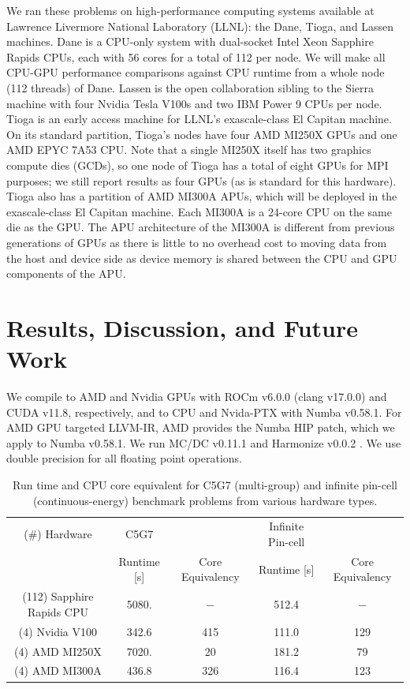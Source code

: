 We ran these problems on high-performance computing systems available at Lawrence Livermore National Laboratory (LLNL): the Dane, Tioga, and Lassen machines.
Dane is a CPU-only system with dual-socket Intel Xeon Sapphire Rapids CPUs, each with 56 cores for a total of 112 per node. 
We will make all CPU-GPU performance comparisons against CPU runtime from a whole node (112 threads) of Dane.
Lassen is the open collaboration sibling to the Sierra machine with four Nvidia Tesla V100s and two IBM Power 9 CPUs per node.
Tioga is an early access machine for LLNL's exascale-class El Capitan machine.
On its standard partition, Tioga's nodes have four AMD MI250X GPUs and one AMD EPYC 7A53 CPU.
Note that a single MI250X itself has two graphics compute dies (GCDs), so one node of Tioga has a total of eight GPUs for MPI purposes; we still report results as four GPUs (as is standard for this hardware).
Tioga also has a partition of AMD MI300A APUs, which will be deployed in the exascale-class El Capitan machine.
Each MI300A is a 24-core CPU on the same die as the GPU.
The APU architecture of the MI300A is different from previous generations of GPUs as there is little to no overhead cost to moving data from the host and device side as device memory is shared between the CPU and GPU components of the APU.

\section{Results, Discussion, and Future Work}
\label{sec:mcdc_prof:results}

We compile to AMD and Nvidia GPUs with ROCm v6.0.0 (clang v17.0.0) and CUDA v11.8, respectively, 
and to CPU and Nvida-PTX with Numba v0.58.1.
For AMD GPU targeted LLVM-IR, AMD provides the Numba HIP patch, which we apply to Numba v0.58.1. %
We run MC/DC v0.11.1 \cite{transport_cement_mcdc_2024} and Harmonize v0.0.2 \cite{harmonize}.
We use double precision for all floating point operations.

\begin{table}[ht]
    \centering
    \caption{Run time and CPU core equivalent for C5G7 (multi-group) and infinite pin-cell (continuous-energy) benchmark problems from various hardware types.}
    \begin{tabular}{@{}c c c c c@{}}
        \hline
        (\#) Hardware & C5G7 & & Infinite Pin-cell & \\
        & Runtime [s] & Core Equivalency & Runtime [s] & Core Equivalency \\
        \hline
        (112) Sapphire Rapids CPU & 5080. & $-$ & 512.4 & $-$ \\
        (4) Nvidia V100 & 342.6 & 415 & 111.0 & 129 \\
        (4) AMD MI250X & 7020. & 20 & 181.2 & 79 \\
        (4) AMD MI300A & 436.8 & 326 & 116.4 & 123 \\
        \hline
    \end{tabular}
    \label{tab:runtime}
\end{table}

